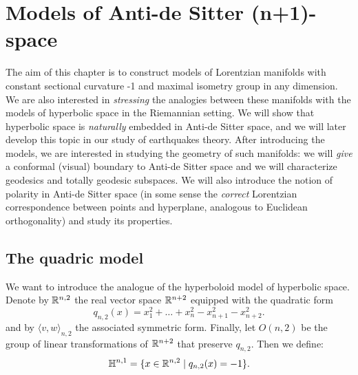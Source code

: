 \chapter{Models of Anti-de Sitter (n+1)-space}
The aim of this chapter is to construct models of Lorentzian manifolds with constant sectional curvature -1 and maximal isometry group in any dimension. We are also interested in \textit{stressing} the analogies between these manifolds with the models of hyperbolic space in the Riemannian setting. We will show that hyperbolic space is \textit{naturally} embedded in Anti-de Sitter space, and we will later develop this topic in our study of earthquakes theory. After introducing the models, we are interested in studying the geometry of such manifolds: we will \textit{give} a conformal (visual) boundary to Anti-de Sitter space and we will characterize geodesics and totally geodesic subspaces. We will also introduce the notion of polarity in Anti-de Sitter space (in some sense the \textit{correct} Lorentzian correspondence between points and hyperplane, analogous to Euclidean orthogonality) and study its properties. 

\section{The quadric model}
We want to introduce the analogue of the hyperboloid model of hyperbolic space. Denote by $\mathbb{R}^{n,2}$ the real vector space $\mathbb{R}^{n+2}$ equipped with the quadratic form 
\[
    q_{n,2}(x)=x_1^{2}+\dots+x_n^{2}-x_{n+1}^{2}-x_{n+2}^2.   
\]
and by $\langle v,w\rangle_{n,2}$ the associated symmetric form. Finally, let $O(n,2)$ be the group of linear transformations of $\mathbb{R}^{n+2}$ that preserve $q_{n,2}.$
Then we define:
\[
    \mathbb{H}^{n,1}=\{x\in \mathbb{R}^{n,2}\;|\;q_{n,2}(x)=-1\}.
\]

